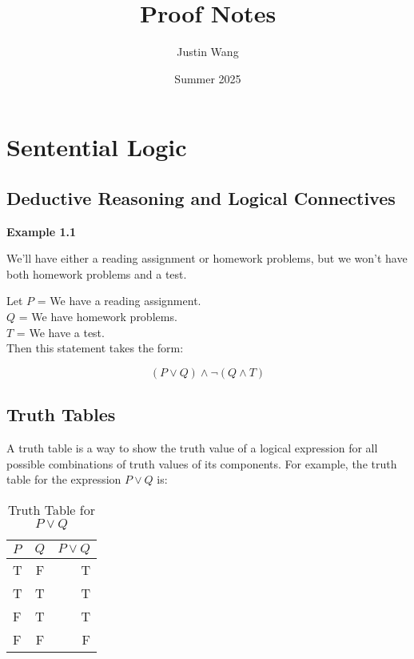 \documentclass[11pt]{article}
\title{Proof Notes}
\author{Justin Wang}
\date{Summer 2025}
\begin{document}
\maketitle

\section{Sentential Logic}
\subsection{Deductive Reasoning and Logical Connectives}
\textbf{Example 1.1}

We'll have either a reading assignment or homework problems, but we won't have both homework problems and a test. 

\begin{center}
Let \( P \) = We have a reading assignment. \\
\( Q \) = We have homework problems. \\
\( T \) = We have a test. \\
Then this statement takes the form:
\end{center}

\begin{equation}
    (P \vee Q) \wedge \neg (Q \wedge T)
\end{equation}

\subsection{Truth Tables}

A truth table is a way to show the truth value of a logical expression for all possible combinations of truth values of its components. For example, the truth table for the expression \( P \vee Q \) is: 

\begin{table}[htbp]
    \caption{Truth Table for \( P \vee Q \)}
    \centering
    \begin{tabular}{|l|c|r|}
        \hline
        \(P\) & \(Q\) & \(P \vee Q\) \\
        \hline
        T & F & T \\
        T & T & T \\
        F & T & T \\
        F & F & F \\
        \hline
    \end{tabular}
\end{table}
\end{document}
